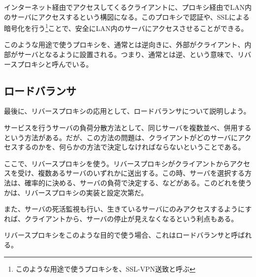 インターネット経由でアクセスしてくるクライアントに、プロキシ経由でLAN内のサーバにアクセスするという構図になる。このプロキシで認証や、SSLによる暗号化を行う\footnote{このような用途で使うプロキシを、SSL-VPN送致と呼ぶ}ことで、安全にLAN内のサーバにアクセスさせることができる。

このような用途で使うプロキシを、通常とは逆向きに、外部がクライアント、内部がサーバとなるように設置される。つまり、通常とは逆、という意味で、リバースプロキシと呼んでいる。

\subsection{ロードバランサ}
最後に、リバースプロキシの応用として、ロードバランサについて説明しよう。

サービスを行うサーバの負荷分散方法として、同じサーバを複数並べ、併用するという方法がある。だが、この方法の問題は、クライアントがどのサーバにアクセスするのかを、何らかの方法で決定しなければならないということである。

ここで、リバースプロキシを使う。リバースプロキシがクライアントからアクセスを受け、複数あるサーバのいずれかに送出する。この時、サーバを選択する方法は、確率的に決める、サーバの負荷で決定する、などがある。このどれを使うかは、リバースプロキシの実装と設定次第だ。

また、サーバの死活監視も行い、生きているサーバにのみアクセスするようにすれば、クライアントから、サーバの停止が見えなくなるという利点もある。

リバースプロキシをこのような目的で使う場合、これはロードバランサと呼ばれる。

